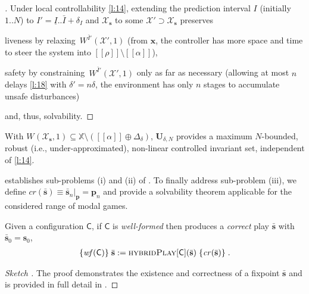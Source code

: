 \documentclass{article}
\newcommand\mcrHMQW[1]{[\![#1]\!]}
\renewcommand\vec[1]{\mathbf{#1}}
\newcommand\mDpbDSN[1][]{W^{#1}}
\newcommand\mBuHESu[1][\delta]{\Delta_{#1}}
\begin{document}
{\begin{proof}[]
  Under local controllability \eqref{l:14}, extending the
  prediction 
  interval $I$ (initially
  $1..N$) 
  to $I'=\underline I..\bar I+{\delta_I}$
  and $\mathcal{X}_{\vec{s}}$ to some
  $\mathcal{X}'\supset\mathcal{X}_{\vec{s}}$ preserves
  \begin{inparaenum}[(i)]
  \item liveness by
    relaxing~$\mDpbDSN[\bar I'](\mathcal{X}',1)$
    (from ${\vec{x}}$, the controller has more space and time to steer
    the system into $\mcrHMQW\rho\setminus\mcrHMQW\alpha$),
  \item safety by
    constraining~$\mDpbDSN[\bar I'](\mathcal{X}',1)$
    only as far as necessary (allowing at most $n$ delays
    \eqref{l:18} with $\delta'=n\delta$, the
    environment has only $n$ stages to accumulate unsafe
    disturbances)
  \end{inparaenum}
  and, thus, solvability.
\end{proof}

\begin{corollary} 
  With
  $\mDpbDSN(\mathcal{X}_{\vec{s}},1) \subseteq
  {\mathbb{X}}\setminus(\mcrHMQW\alpha\oplus\mBuHESu)$,
  $\vec{U}_{\delta,N}$ 
  provides a maximum
  $N$-bounded, robust (i.e., under-approximated),
  non-linear controlled invariant set, independent of
  \eqref{l:14}.
\end{corollary}

 establishes sub-problems (i) and (ii) of
.  To finally address sub-problem
(iii), we define
$\mathit{cr}(\bar{\vec{s}})\equiv\bar{\vec{s}}_n|_{\vec{p}}={\vec{p}}_n$ and provide a
solvability theorem applicable for the considered range of
modal games.

\begin{theorem}
  \label{l:26}
  Given a configuration $\mathsf{C}$, if $\mathsf{C}$ is
  \emph{well-formed} then  produces a
  \emph{correct} play $\bar{\vec{s}}$ with
  $\bar{\vec{s}}_0={\vec{s}}_0$, 
  \begin{align*}
    \{\mathit{wf}(\mathsf{C})\}\;
    \bar{\vec{s}}:=\textsc{hybridPlay}[\mathsf{C}](\bar{\vec{s}})\;
    \{\mathit{cr}(\bar{\vec{s}})\}\;.
  \end{align*}
\end{theorem}

\begin{proof}[Sketch ]
  The proof demonstrates the existence and correctness of a fixpoint
  $\bar{\vec{s}}$ and is provided in full detail in
  .
\end{proof}

}
\end{document}
